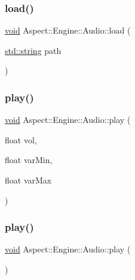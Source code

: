 \subsubsection{\texorpdfstring{load()}{load()}}
{\footnotesize\ttfamily \mbox{\hyperlink{_s_d_l__opengles2__gl2ext_8h_ae5d8fa23ad07c48bb609509eae494c95}{void}} Aspect\+::\+Engine\+::\+Audio\+::load (\begin{DoxyParamCaption}\item[{\mbox{\hyperlink{_s_d_l__opengl__glext_8h_ae84541b4f3d8e1ea24ec0f466a8c568b}{std\+::string}}}]{path }\end{DoxyParamCaption})}

\mbox{\label{class_aspect_1_1_engine_1_1_audio_ae0263b513749d07eee8e5596006aba04}} 
\subsubsection{\texorpdfstring{play()}{play()}\hspace{0.1cm}{\footnotesize\ttfamily [1/2]}}
{\footnotesize\ttfamily \mbox{\hyperlink{_s_d_l__opengles2__gl2ext_8h_ae5d8fa23ad07c48bb609509eae494c95}{void}} Aspect\+::\+Engine\+::\+Audio\+::play (\begin{DoxyParamCaption}\item[{float}]{vol,  }\item[{float}]{var\+Min,  }\item[{float}]{var\+Max }\end{DoxyParamCaption})}

\mbox{\label{class_aspect_1_1_engine_1_1_audio_aa5902d97e785ed834b24f2b4fa8abde6}} 
\subsubsection{\texorpdfstring{play()}{play()}\hspace{0.1cm}{\footnotesize\ttfamily [2/2]}}
{\footnotesize\ttfamily \mbox{\hyperlink{_s_d_l__opengles2__gl2ext_8h_ae5d8fa23ad07c48bb609509eae494c95}{void}} Aspect\+::\+Engine\+::\+Audio\+::play (\begin{DoxyParamCaption}{ }\end{DoxyParamCaption})}



